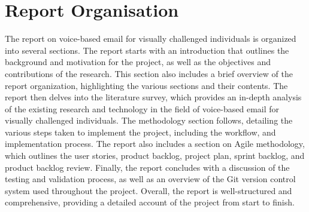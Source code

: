 \documentclass[12pt]{report}
\begin{document}
\section{Report Organisation}
The report on voice-based email for visually challenged individuals is organized into several sections. The report starts with an introduction that outlines the background and motivation for the project, as well as the objectives and contributions of the research. This section also includes a brief overview of the report organization, highlighting the various sections and their contents.\newline\newline
The report then delves into the literature survey, which provides an in-depth analysis of the existing research and technology in the field of voice-based email for visually challenged individuals. The methodology section follows, detailing the various steps taken to implement the project, including the workflow, and implementation process. The report also includes a section on Agile methodology, which outlines the user stories, product backlog, project plan, sprint backlog, and product backlog review. Finally, the report concludes with a discussion of the testing and validation process, as well as an overview of the Git version control system used throughout the project. Overall, the report is well-structured and comprehensive, providing a detailed account of the project from start to finish.\newline\newline


\end{document}
